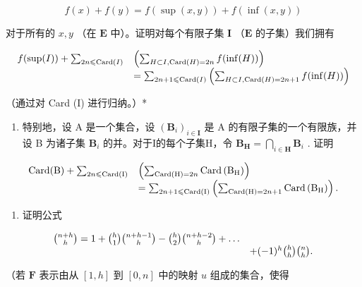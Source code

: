 \[
f (x) + f (y) = f (\sup (x, y)) + f (\inf (x, y))
\]

对于所有的 \(x, y\) （在 \(\mathbf{E}\) 中）。证明对每个有限子集 \(\mathbf{I}\) （\(\mathbf{E}\) 的子集）我们拥有

\[
\begin{array}{r l} f (\sup (I)) + \sum_ {2 n \leqslant \operatorname{Card} (I)} & \left(\sum_ {H \subset I, \operatorname{Card} (H) = 2 n} f (\inf (H))\right) \\ & = \sum_ {2 n + 1 \leqslant \operatorname{Card} (I)} \left(\sum_ {H \subset I, \operatorname{Card} (H) = 2 n + 1} f (\inf (H))\right) \end{array}
\]

（通过对 Card (I) 进行归纳。）*

\begin{enumerate}
\def\labelenumi{(\alph{enumi})}
\setcounter{enumi}{1}
\tightlist
\item
  特别地，设 A 是一个集合，设 \((\mathbf{B}_i)_{i\in \mathbf{I}}\) 是 A 的有限子集的一个有限族，并设 B 为诸子集 \(\mathbf{B}_i\) 的并。对于I的每个子集H，令 \(\mathbf{B}_{\mathbf{H}} = \bigcap_{i\in \mathbf{H}}\mathbf{B}_i\) . 证明
\end{enumerate}

\[
\begin{array}{r l} \operatorname{Card} (\mathrm{B}) + \sum_ {2 n \leqslant \operatorname{Card} (\mathrm{I})} & \left(\sum_ {\operatorname{Card} (\mathrm{H}) = 2 n} \operatorname{Card} \left(\mathrm{B} _ {\mathrm{H}}\right)\right) \\ & = \sum_ {2 n + 1 \leqslant \operatorname{Card} (\mathrm{I})} \left(\sum_ {\operatorname{Card} (\mathrm{H}) = 2 n + 1} \operatorname{Card} \left(\mathrm{B} _ {\mathrm{H}}\right)\right). \end{array}
\]

\begin{enumerate}
\def\labelenumi{\arabic{enumi}.}
\setcounter{enumi}{5}
\tightlist
\item
  证明公式
\end{enumerate}

\[
\begin{array}{r l} \binom {n + h} {h} = 1 + \binom {h} {1} \binom {n + h - 1} {h} - \binom {h} {2} \binom {n + h - 2} {h} + \dots \\ & + (- 1) ^ {h} \binom {h} {h} \binom {n} {h}. \end{array}
\]

（若 \(\mathbf{F}\) 表示由从 \([1, h]\) 到 \([0, n]\) 中的映射 \(u\) 组成的集合，使得

